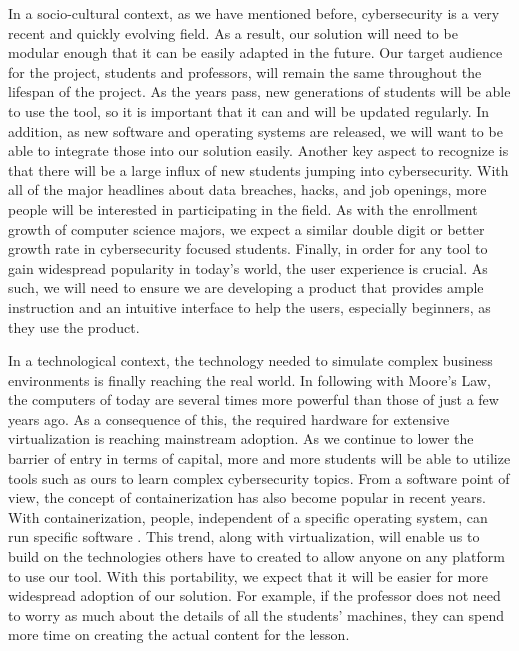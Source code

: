 \documentclass[openright]{report}
\begin{document}
\par In a socio-cultural context, as we have mentioned before, cybersecurity is a very recent and quickly evolving field. As a result, our solution will need to be modular enough that it can be easily adapted in the future. Our target audience for the project, students and professors, will remain the same throughout the lifespan of the project. As the years pass, new generations of students will be able to use the tool, so it is important that it can and will be updated regularly. In addition, as new software and operating systems are released, we will want to be able to integrate those into our solution easily. Another key aspect to recognize is that there will be a large influx of new students jumping into cybersecurity. With all of the major headlines about data breaches, hacks, and job openings, more people will be interested in participating in the field. As with the enrollment growth of computer science majors, we expect a similar double digit or better growth rate in cybersecurity focused students. Finally, in order for any tool to gain widespread popularity in today's world, the user experience is crucial. As such, we will need to ensure we are developing a product that provides ample instruction and an intuitive interface to help the users, especially beginners, as they use the product.

\par In a technological context, the technology needed to simulate complex business environments is finally reaching the real world. In following with Moore's Law, the computers of today are several times more powerful than those of just a few years ago. As a consequence of this, the required hardware for extensive virtualization is reaching mainstream adoption. As we continue to lower the barrier of entry in terms of capital, more and more students will be able to utilize tools such as ours to learn complex cybersecurity topics. From a software point of view, the concept of containerization has also become popular in recent years. With containerization, people, independent of a specific operating system, can run specific software \cite{docker}. This trend, along with virtualization, will enable us to build on the technologies others have to created to allow anyone on any platform to use our tool. With this portability, we expect that it will be easier for more widespread adoption of our solution. For example, if the professor does not need to worry as much about the details of all the students' machines, they can spend more time on creating the actual content for the lesson.
\end{document}
